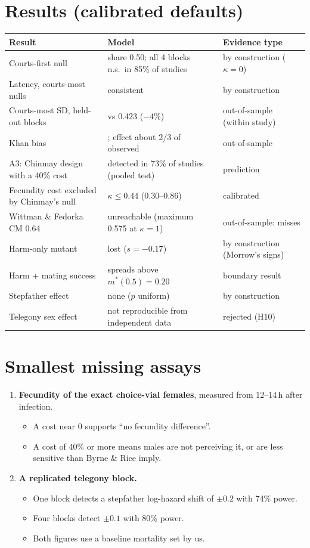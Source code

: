 \section{Results (calibrated defaults)}
\begin{tabularx}{\textwidth}{>{\raggedright\arraybackslash}p{4.2cm}>{\raggedright\arraybackslash}X>{\raggedright\arraybackslash}p{3.8cm}}\toprule
Result & Model & Evidence type\\\midrule
Courts-first null & share 0.50; all 4 blocks n.s.\ in 85\% of studies & by construction ($\kappa=0$)\\
Latency, courts-most nulls & consistent & by construction\\
Courts-most SD, held-out blocks & 0.405 vs 0.423 ($-4\%$) & out-of-sample (within study)\\
Khan bias & 0.475; effect about 2/3 of observed & out-of-sample\\
A3: Chinmay design with a 40\% cost & detected in 73\% of studies (pooled test) & prediction\\
Fecundity cost excluded by Chinmay's null & $\kappa\le0.44$ (0.30--0.86) & calibrated\\
Wittman \& Fedorka CM 0.64 & unreachable (maximum 0.575 at $\kappa=1$) & out-of-sample: misses\\
Harm-only mutant & lost ($s=-0.17$) & by construction (Morrow's signs)\\
Harm + mating success & spreads above $m^*(0.5)=0.20$ & boundary result\\
Stepfather effect & none ($p$ uniform) & by construction\\
Telegony sex effect & not reproducible from independent data & rejected (H10)\\\bottomrule
\end{tabularx}

\section{Smallest missing assays}
\begin{enumerate}
\item \textbf{Fecundity of the exact choice-vial females}, measured from 12--14\,h after infection.
  \begin{itemize}
  \item A cost near 0 supports ``no fecundity difference''.
  \item A cost of 40\% or more means males are not perceiving it, or are less sensitive than Byrne \& Rice imply.
  \end{itemize}
\item \textbf{A replicated telegony block.}
  \begin{itemize}
  \item One block detects a stepfather log-hazard shift of $\pm0.2$ with 74\% power.
  \item Four blocks detect $\pm0.1$ with 80\% power.
  \item Both figures use a baseline mortality set by us.
  \end{itemize}
\end{enumerate}

